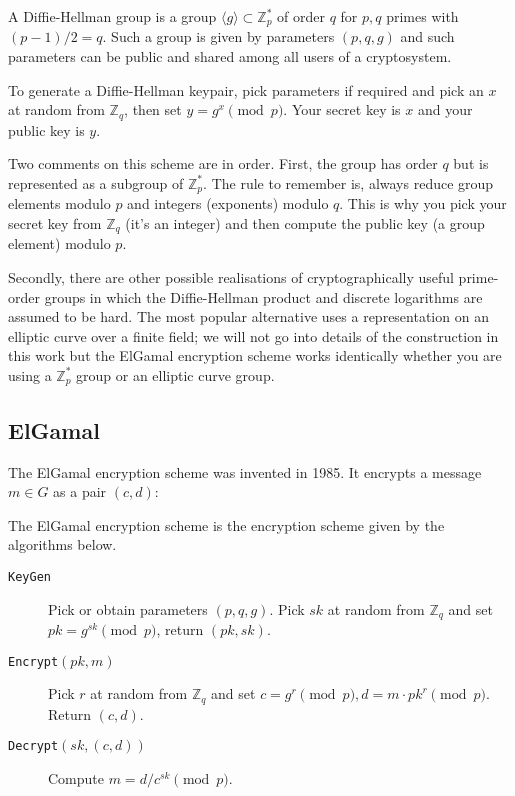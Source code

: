 \documentclass[envcountsame]{llncs}
\newcommand{\alg}[1]{\textup{\texttt{#1}}}
\begin{document}
\begin{definition}
A Diffie-Hellman group is a group $\langle g \rangle \subset \mathbb Z^*_p$ of
order $q$ for $p, q$ primes with $(p-1)/2 = q$. Such a group is given by
parameters $(p, q, g)$ and such parameters can be public and shared among all
users of a cryptosystem.

To generate a Diffie-Hellman keypair, pick parameters if required and pick an
$x$ at random from $\mathbb Z_q$, then set $y = g^x \pmod{p}$. Your secret key
is $x$ and your public key is $y$.
\end{definition}

Two comments on this scheme are in order. First, the group has order $q$ but is
represented as a subgroup of $\mathbb Z^*_p$. 
The rule to
remember is, always reduce group elements modulo $p$ and integers (exponents)
modulo $q$. This is why you pick your secret key from $\mathbb Z_q$ (it's an
integer) and then compute the public key (a group element) modulo $p$.

Secondly, there are other possible realisations of cryptographically useful
prime-order groups in which the Diffie-Hellman product and discrete logarithms
are assumed to be hard. The most popular alternative uses a representation on an
elliptic curve over a finite field; we will not go into details of the
construction in this work but the ElGamal encryption scheme works identically
whether you are using a $\mathbb Z^*_p$ group or an elliptic curve group.

\subsection{ElGamal}

The ElGamal encryption scheme \cite{E85} was invented in 1985.
It encrypts a message $m \in G$ as a pair $(c, d)$:

\begin{definition}
The ElGamal encryption scheme is the encryption scheme given by the algorithms below.
\end{definition}
\begin{description}

\item[\alg{KeyGen}] Pick or obtain parameters $(p, q, g)$. Pick $sk$ at random
from $\mathbb Z_q$ and set $pk = g^{sk} \pmod{p}$, return $(pk, sk)$.

\item[\alg{Encrypt}$(pk, m)$] Pick $r$ at random from $\mathbb Z_q$ and set
$c = g^r \pmod{p}, d = m \cdot pk^r \pmod{p}$. Return $(c, d)$.

\item[\alg{Decrypt}$(sk, (c, d))$] Compute $m = d / c^{sk} \pmod{p}$.
\end{description}
\end{document}
